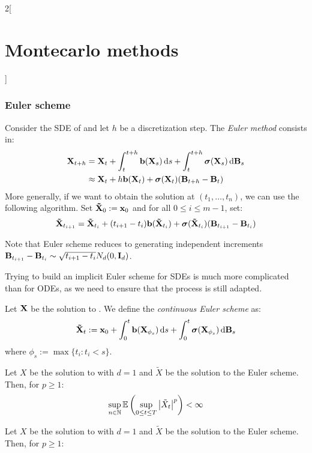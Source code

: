\documentclass[../../../main_math.tex]{subfiles}
\begin{document}
\begin{multicols}{2}[\section{Montecarlo methods}]
  \subsubsection{Euler scheme}
  \begin{definition}
    Consider the SDE of  and let $h$ be a discretization step. The \emph{Euler method} consists in:
    \begin{align*}
      \boldsymbol{\mathrm{X}}_{t+h} & =\boldsymbol{\mathrm{X}}_t+\int_t^{t+h}\boldsymbol{\mathrm{b}}(\boldsymbol{\mathrm{X}}_s)\dd{s}+\int_t^{t+h}\boldsymbol{\mathrm{\sigma}}(\boldsymbol{\mathrm{X}}_s)\dd{\boldsymbol{\mathrm{B}}_s} \\
                   & \approx \boldsymbol{\mathrm{X}}_t+h\boldsymbol{\mathrm{b}}(\boldsymbol{\mathrm{X}}_t)+\boldsymbol{\mathrm{\sigma}}(\boldsymbol{\mathrm{X}}_t)(\boldsymbol{\mathrm{B}}_{t+h}-\boldsymbol{\mathrm{B}}_t)
    \end{align*}
    More generally, if we want to obtain the solution at $(t_1,\dots,t_n)$, we can use the following algorithm. Set $\boldsymbol{\mathrm{\tilde{X}}}_0:=\boldsymbol{\mathrm{x}}_0$ and for all $0\leq i\leq m-1$, set:
    $$
      \boldsymbol{\mathrm{\tilde{X}}}_{t_{i+1}}=\boldsymbol{\mathrm{\tilde{X}}}_{t_i}+(t_{i+1}-t_i)\boldsymbol{\mathrm{b}}(\boldsymbol{\mathrm{\tilde{X}}}_{t_i})+\boldsymbol{\mathrm{\sigma}}(\boldsymbol{\mathrm{\tilde{X}}}_{t_i})(\boldsymbol{\mathrm{B}}_{t_{i+1}}-\boldsymbol{\mathrm{B}}_{t_i})
    $$
  \end{definition}
  \begin{remark}
    Note that Euler scheme reduces to generating independent increments $\boldsymbol{\mathrm{B}}_{t_{i+1}}-\boldsymbol{\mathrm{B}}_{t_i}\sim \sqrt{t_{i+1}-t_i}N_d(0,\boldsymbol{\mathrm{I}}_d)$.
  \end{remark}
  \begin{remark}
    Trying to build an implicit Euler scheme for SDEs is much more complicated than for  ODEs, as we need to ensure that the process is still adapted.
  \end{remark}
  \begin{definition}
    Let $\boldsymbol{\mathrm{X}}$ be the solution to . We define the \emph{continuous Euler scheme} as:
    $$
      \boldsymbol{\mathrm{\tilde{X}}}_t:=\boldsymbol{\mathrm{x}}_0+\int_0^t\boldsymbol{\mathrm{b}}(\boldsymbol{\mathrm{X}}_{\phi_s})\dd{s}+\int_0^t\boldsymbol{\mathrm{\sigma}}(\boldsymbol{\mathrm{X}}_{\phi_s})\dd{\boldsymbol{\mathrm{B}}_s}
    $$
    where $\phi_s:=\max\{ t_i: t_i< s\}$.
  \end{definition}
  \begin{lemma}
    Let $X$ be the solution to  with $d=1$ and $\tilde{X}$ be the solution to the Euler scheme. Then, for $p\geq 1$:
    $$
      \sup_{n\in\mathbb{N}}\mathbb{E}\left( \sup_{0\leq t\leq T}\abs{\tilde{X}_t}^p\right)<\infty
    $$
  \end{lemma}
  \begin{lemma}
    Let $X$ be the solution to  with $d=1$ and $\tilde{X}$ be the solution to the Euler scheme. Then, for $p\geq 1$:
    $$
$$
\end{lemma}
\end{multicols}
\end{document}
